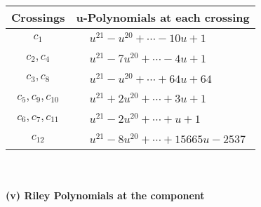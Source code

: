 \documentclass[1p]{elsarticle_modified}
\theoremstyle{definition}
\begin{document}
\begin{tabular}{m{50pt}|m{274pt}}
Crossings & \hspace{64pt}u-Polynomials at each crossing \\
\hline $$\begin{aligned}c_{1}\end{aligned}$$&$\begin{aligned}
&u^{21}- u^{20}+\cdots-10 u+1
\end{aligned}$\\
\hline $$\begin{aligned}c_{2},c_{4}\end{aligned}$$&$\begin{aligned}
&u^{21}-7 u^{20}+\cdots-4 u+1
\end{aligned}$\\
\hline $$\begin{aligned}c_{3},c_{8}\end{aligned}$$&$\begin{aligned}
&u^{21}- u^{20}+\cdots+64 u+64
\end{aligned}$\\
\hline $$\begin{aligned}c_{5},c_{9},c_{10}\end{aligned}$$&$\begin{aligned}
&u^{21}+2 u^{20}+\cdots+3 u+1
\end{aligned}$\\
\hline $$\begin{aligned}c_{6},c_{7},c_{11}\end{aligned}$$&$\begin{aligned}
&u^{21}-2 u^{20}+\cdots+u+1
\end{aligned}$\\
\hline $$\begin{aligned}c_{12}\end{aligned}$$&$\begin{aligned}
&u^{21}-8 u^{20}+\cdots+15665 u-2537
\end{aligned}$\\
\hline
\end{tabular}\\~\\
\newpage\renewcommand{\arraystretch}{1}
\flushleft \textbf{(v) Riley Polynomials at the component}\newline \\
\end{document}
